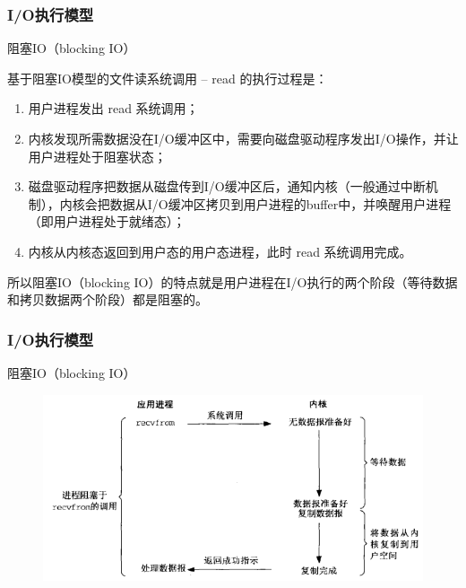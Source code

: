 \begin{frame}[fragile]
    \frametitle{I/O执行模型}
    阻塞IO（blocking IO）
    
    基于阻塞IO模型的文件读系统调用 – read 的执行过程是：
    \begin{enumerate}

        \item 用户进程发出 read 系统调用；
        \item 内核发现所需数据没在I/O缓冲区中，需要向磁盘驱动程序发出I/O操作，并让用户进程处于阻塞状态；
        \item 磁盘驱动程序把数据从磁盘传到I/O缓冲区后，通知内核（一般通过中断机制），内核会把数据从I/O缓冲区拷贝到用户进程的buffer中，并唤醒用户进程（即用户进程处于就绪态）；
        \item 内核从内核态返回到用户态的用户态进程，此时 read 系统调用完成。
    \end{enumerate}       

    所以阻塞IO（blocking IO）的特点就是用户进程在I/O执行的两个阶段（等待数据和拷贝数据两个阶段）都是阻塞的。
    
\end{frame}
\begin{frame}[fragile]
    \frametitle{I/O执行模型}
    阻塞IO（blocking IO）
    \begin{figure}
        \includegraphics[width=0.7\linewidth]{figs/block-io.png}
    \end{figure}
\end{frame}
